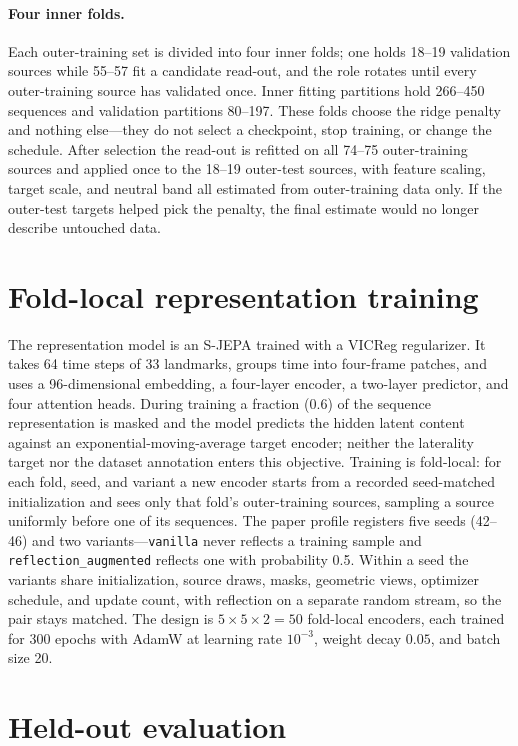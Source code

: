 \documentclass{article}
\begin{document}
\paragraph{Four inner folds.} Each outer-training set is divided into four inner folds; one holds 18--19 validation sources while 55--57 fit a candidate read-out, and the role rotates until every outer-training source has validated once. Inner fitting partitions hold 266--450 sequences and validation partitions 80--197. These folds choose the ridge penalty and nothing else---they do not select a checkpoint, stop training, or change the schedule. After selection the read-out is refitted on all 74--75 outer-training sources and applied once to the 18--19 outer-test sources, with feature scaling, target scale, and neutral band all estimated from outer-training data only. If the outer-test targets helped pick the penalty, the final estimate would no longer describe untouched data.

\section{Fold-local representation training}

The representation model is an S-JEPA trained with a VICReg regularizer. It takes 64 time steps of 33 landmarks, groups time into four-frame patches, and uses a 96-dimensional embedding, a four-layer encoder, a two-layer predictor, and four attention heads. During training a fraction (0.6) of the sequence representation is masked and the model predicts the hidden latent content against an exponential-moving-average target encoder; neither the laterality target nor the dataset annotation enters this objective. Training is fold-local: for each fold, seed, and variant a new encoder starts from a recorded seed-matched initialization and sees only that fold's outer-training sources, sampling a source uniformly before one of its sequences. The paper profile registers five seeds (42--46) and two variants---\texttt{vanilla} never reflects a training sample and \texttt{reflection\_augmented} reflects one with probability 0.5. Within a seed the variants share initialization, source draws, masks, geometric views, optimizer schedule, and update count, with reflection on a separate random stream, so the pair stays matched. The design is $5\times5\times2=50$ fold-local encoders, each trained for 300 epochs with AdamW at learning rate $10^{-3}$, weight decay $0.05$, and batch size 20.

\section{Held-out evaluation}
\end{document}
